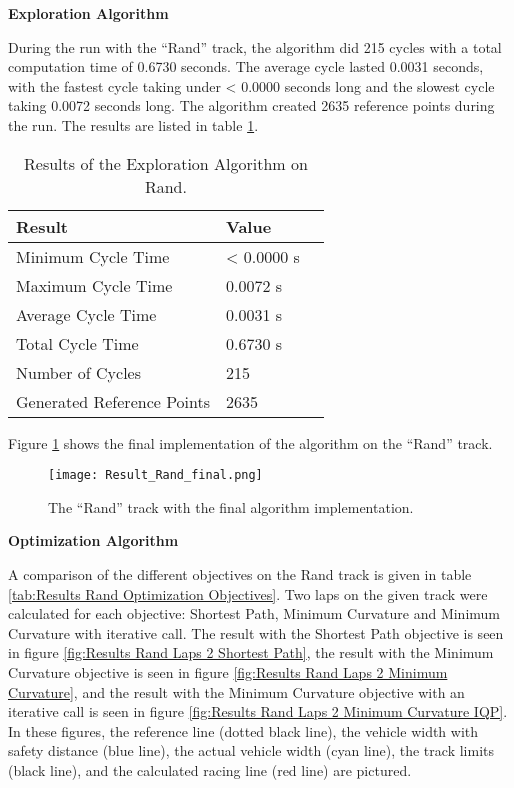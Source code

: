 \textbf{Exploration Algorithm}

During the run with the ``Rand'' track, the algorithm did 215 cycles with a total computation time of 0.6730 seconds. The average cycle lasted 0.0031 seconds, with the fastest cycle taking under < 0.0000 seconds long and the slowest cycle taking 0.0072 seconds long. The algorithm created 2635 reference points during the run. The results are listed in table \ref{tab:Results Rand Exploration}.

\begin{table}[H]
    \centering
    \begin{tabular}{|l|l|l|}
        \hline
        \textbf{Result}            & \textbf{Value} \\ \hline
        Minimum Cycle Time         & < 0.0000 s     \\ \hline
        Maximum Cycle Time         & 0.0072 s       \\ \hline
        Average Cycle  Time        & 0.0031 s       \\ \hline
        Total Cycle Time           & 0.6730 s       \\ \hline
        Number of Cycles           & 215            \\ \hline
        Generated Reference Points & 2635           \\ \hline
    \end{tabular}
    \caption{Results of the Exploration Algorithm on Rand.}
    \label{tab:Results Rand Exploration}
\end{table}

Figure \ref{fig:Result Rand Final} shows the final implementation of the algorithm on the ``Rand'' track.
\begin{figure}[H]
    \centering
    \texttt{[image: Result\_Rand\_final.png]}
    \caption{The ``Rand'' track with the final algorithm implementation.}
    \label{fig:Result Rand Final}
\end{figure}

\textbf{Optimization Algorithm}

A comparison of the different objectives on the Rand track is given in table \ref{tab:Results Rand Optimization Objectives}. Two laps on the given track were calculated for each objective: Shortest Path, Minimum Curvature and Minimum Curvature with iterative call. The result with the Shortest Path objective is seen in figure \ref{fig:Results Rand Laps 2 Shortest Path}, the result with the Minimum Curvature objective is seen in figure \ref{fig:Results Rand Laps 2 Minimum Curvature}, and the result with the Minimum Curvature objective with an iterative call is seen in figure \ref{fig:Results Rand Laps 2 Minimum Curvature IQP}. In these figures, the reference line (dotted black line), the vehicle width with safety distance (blue line), the actual vehicle width (cyan line), the track limits (black line), and the calculated racing line (red line) are pictured.

